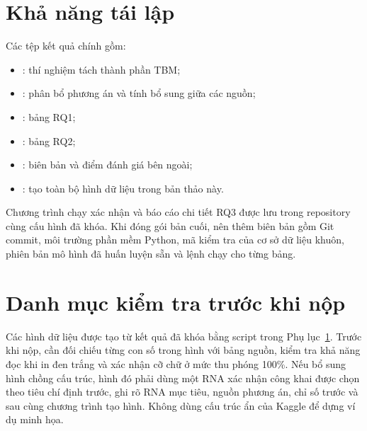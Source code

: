 \documentclass[12pt,a4paper,oneside]{report}
\begin{document}
\appendix

\chapter{Khả năng tái lập}
\label{app:repro_vi}

Các tệp kết quả chính gồm:
\begin{itemize}
  \item {}: thí nghiệm tách thành phần TBM;
  \item {}: phân bổ phương án và tính bổ sung giữa các nguồn;
  \item {}: bảng RQ1;
  \item {}: bảng RQ2;
  \item {}: biên bản và điểm đánh giá bên ngoài;
  \item {}: tạo toàn bộ hình dữ liệu trong bản thảo này.
\end{itemize}

Chương trình chạy xác nhận và báo cáo chi tiết RQ3 được lưu trong repository cùng cấu
hình đã khóa. Khi đóng gói bản cuối, nên thêm biên bản gồm Git commit, môi trường phần
mềm Python, mã kiểm tra của cơ sở dữ liệu khuôn, phiên bản mô hình đã huấn luyện sẵn và
lệnh chạy cho từng bảng.

\chapter{Danh mục kiểm tra trước khi nộp}

Các hình dữ liệu được tạo từ kết quả đã khóa bằng script trong
Phụ lục~\ref{app:repro_vi}. Trước khi nộp, cần đối chiếu từng con số trong hình với bảng
nguồn, kiểm tra khả năng đọc khi in đen trắng và xác nhận cỡ chữ ở mức thu phóng 100\%.
Nếu bổ sung hình chồng cấu trúc, hình đó phải dùng một RNA xác nhận công khai được chọn
theo tiêu chí định trước, ghi rõ RNA mục tiêu, nguồn phương án, chỉ số trước và sau cùng chương trình
tạo hình. Không dùng cấu trúc ẩn của Kaggle để dựng ví dụ minh họa.


\end{document}
